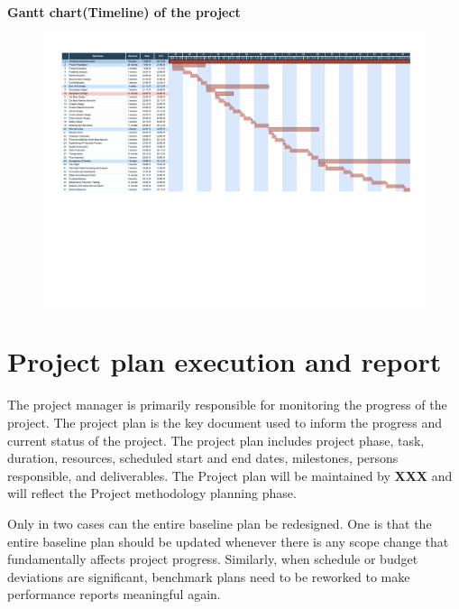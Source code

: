 \begin{landscape}

\begin{center}
\Large \textbf{Gantt chart(Timeline) of the project}   

\begin{figure}[!htb]
\centering
\includegraphics[angle=-90,width=25cm]{pic/gantt.pdf}
\end{figure}

\end{center}

\end{landscape}

\section{Project plan execution and report}

The project manager is primarily responsible for monitoring the progress of the project. The project plan is the key document used to inform the progress and current status of the project. The project plan includes project phase, task, duration, resources, scheduled start and end dates, milestones, persons responsible, and deliverables. The Project plan will be maintained by \textbf{XXX} and will reflect the Project methodology planning phase.

Only in two cases can the entire baseline plan be redesigned. One is that the entire baseline plan should be updated whenever there is any scope change that fundamentally affects project progress. Similarly, when schedule or budget deviations are significant, benchmark plans need to be reworked to make performance reports meaningful again.

